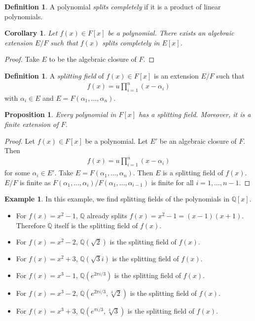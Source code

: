 \documentclass[12pt]{report}
\theoremstyle{plain}
\newtheorem{corollary}[theorem]{Corollary}
\newtheorem{proposition}[theorem]{Proposition}
\theoremstyle{remark}
\theoremstyle{definition}
\newtheorem{definition}[theorem]{Definition}
\newtheorem{example}[theorem]{Example}
\newcommand{\Q}{\mathbb{Q}}
\begin{document}
\begin{definition}
    A polynomial \emph{splits completely} if it is a product of linear polynomials.
\end{definition}

\begin{corollary}
    Let $f(x)\in F[x]$ be a polynomial. There exists an algebraic extension $E/F$ such that $f(x)$ splits completely in $E[x]$.
\end{corollary}
\begin{proof}
    Take $E$ to be the algebraic closure of $F$.
\end{proof}

\begin{definition}
    A \emph{splitting field} of $f(x)\in F[x]$ is an extension $E/F$ such that
    \begin{align*}
        f(x) = u\prod_{i=1}^n (x-\alpha_i)
    \end{align*}
    with $\alpha_i\in E$ and $E=F(\alpha_1,\dots,\alpha_n)$.
\end{definition}

\begin{proposition}
    Every polynomial in $F[x]$ has a splitting field. Moreover, it is a finite extension of $F$.
\end{proposition}
\begin{proof}
    Let $f(x)\in F[x]$ be a polynomial. Let $E'$ be an algebraic closure of $F$. Then
    \begin{align*}
        f(x) = u\prod_{i=1}^n (x-\alpha_i)
    \end{align*}
    for some $\alpha_i\in E'$. Take $E=F(\alpha_1,\dots,\alpha_n)$. Then $E$ is a splitting field of $f(x)$. $E/F$ is finite as $F(\alpha_1,\dots,\alpha_i)/F(\alpha_1,\dots,\alpha_{i-1})$ is finite for all $i=1,\dots,n-1$.
\end{proof}

\begin{example}
    In this example, we find splitting fields of the polynomials in $\Q[x]$.
    \begin{itemize}
        \item For $f(x)=x^2-1$, $\Q$ already splits $f(x) = x^2-1=(x-1)(x+1)$. Therefore $\Q$ itself is the splitting field of $f(x)$.
        \item For $f(x) = x^2-2$, $\Q(\sqrt{2})$ is the splitting field of $f(x)$.
        \item For $f(x) = x^2+3$, $\Q(\sqrt{3}i)$ is the splitting field of $f(x)$.
        \item For $f(x) = x^3-1$, $\Q(e^{2\pi i/3})$ is the splitting field of $f(x)$.
        \item For $f(x) = x^3-2$, $\Q(e^{2\pi i/3},\sqrt[3]{2})$ is the splitting field of $f(x)$.
        \item For $f(x) = x^3+3$, $\Q(e^{\pi i/3},\sqrt[3]{3})$ is the splitting field of $f(x)$.
    \end{itemize}
\end{example}
\end{document}
